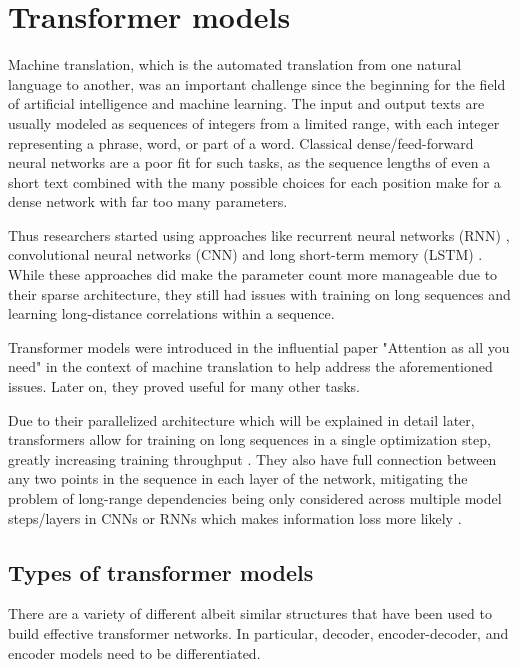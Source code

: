 \section{Transformer models}

Machine translation, which is the automated translation from one natural language to another, was an important challenge since the beginning for the field of artificial intelligence and machine learning.
The input and output texts are usually modeled as sequences of integers from a limited range, with each integer representing a phrase, word, or part of a word.
Classical dense/feed-forward neural networks are a poor fit for such tasks, as the sequence lengths of even a short text combined with the many possible choices for each position make for a dense network with far too many parameters.

Thus researchers started using approaches like recurrent neural networks (RNN) \cite{phrasereps}, convolutional neural networks (CNN) \cite{convseq} and long short-term memory (LSTM) \cite{seq2seq}.
While these approaches did make the parameter count more manageable due to their sparse architecture, they still had issues with training on long sequences and learning long-distance correlations within a sequence.

Transformer models were introduced in the influential paper "Attention as all you need" \cite{allyouneed} in the context of machine translation to help address the aforementioned issues. Later on, they proved useful for many other tasks. 

Due to their parallelized architecture which will be explained in detail later, transformers allow for training on long sequences in a single optimization step, greatly increasing training throughput . They also have full connection between any two points in the sequence in each layer of the network, mitigating the problem of long-range dependencies being only considered across multiple model steps/layers in CNNs or RNNs which makes information loss more likely .

\subsection{Types of transformer models}

There are a variety of different albeit similar structures that have been used to build effective transformer networks. In particular, decoder, encoder-decoder, and encoder models need to be differentiated.

